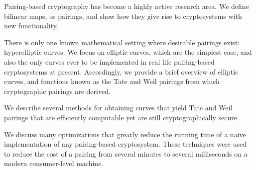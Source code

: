 Pairing-based cryptography has become a highly active research area.
We define bilinear maps, or pairings, and show how they
give rise to cryptosystems with new functionality.

There is only one known mathematical setting where desirable
pairings exist: hyperelliptic curves. We focus on elliptic curves,
which are the simplest case, and also the only curves ever to be implemented
in real life pairing-based cryptosystems at present.
Accordingly,
we provide a brief overview of elliptic curves, and functions known as
the Tate and Weil pairings from which cryptographic pairings are derived.

We describe several methods for obtaining curves that yield Tate and Weil
pairings that are efficiently computable yet are still cryptographically
secure.

We discuss many optimizations that greatly reduce the running time
of a naive implementation of any pairing-based cryptosystem. These
techniques were used to reduce the
cost of a pairing from several minutes
to several milliseconds on a modern consumer-level machine.

